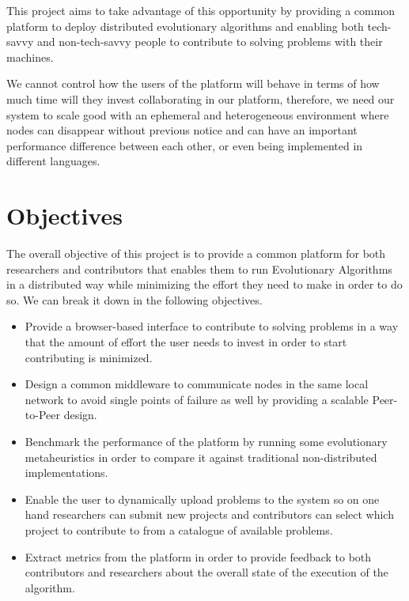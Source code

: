 This project aims to take advantage of this opportunity by providing a common platform to deploy distributed evolutionary algorithms and enabling both tech-savvy and non-tech-savvy people to contribute to solving problems with their machines.

We cannot control how the users of the platform will behave in terms of how much time will they invest collaborating in our platform, therefore, we need our system to scale good with an ephemeral and heterogeneous environment where nodes can disappear without previous notice and can have an important performance difference between each other, or even being implemented in different languages. 


\section{Objectives}
The overall objective of this project is to provide a common platform for both researchers and contributors that enables them to run Evolutionary Algorithms in a distributed way while minimizing the effort they need to make in order to do so. We can break it down in the following objectives.

\begin{itemize}
    \item Provide a browser-based interface to contribute to solving problems in a way that the amount of effort the user needs to invest in order to start contributing is minimized.
    
    \item Design a common middleware to communicate nodes in the same local network to avoid single points of failure as well by providing a scalable Peer-to-Peer design.
    
    \item Benchmark the performance of the platform by running some evolutionary metaheuristics in order to compare it against traditional non-distributed implementations.
    
    \item Enable the user to dynamically upload problems to the system so on one hand researchers can submit new projects and contributors can select which project to contribute to from a catalogue of available problems.
    
    \item Extract metrics from the platform in order to provide feedback to both contributors and researchers about the overall state of the execution of the algorithm.
\end{itemize}
